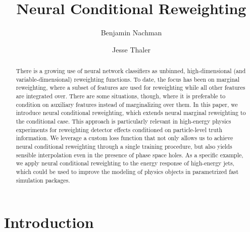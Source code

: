 \documentclass[aps,prx,reprint,preprintnumbers,superscriptaddress,nofootinbib,longbibliography,floatfix]{revtex4-2}
\begin{document}

\title{Neural Conditional Reweighting}

\author{Benjamin Nachman}

\author{Jesse Thaler}

\begin{abstract}
%
There is a growing use of neural network classifiers as unbinned, high-dimensional (and variable-dimensional) reweighting functions.
%
To date, the focus has been on marginal reweighting, where a subset of features are used for reweighting while all other features are integrated over.
%
There are some situations, though, where it is preferable to condition on auxiliary features instead of marginalizing over them.
%
In this paper, we introduce neural conditional reweighting, which extends neural marginal reweighting to the conditional case.
%
This approach is particularly relevant in high-energy physics experiments for reweighting detector effects conditioned on particle-level truth information.
%
We leverage a custom loss function that not only allows us to achieve neural conditional reweighting through a single training procedure, but also yields sensible interpolation even in the presence of phase space holes.
%
As a specific example, we apply neural conditional reweighting to the energy response of high-energy jets, which could be used to improve the modeling of physics objects in parametrized fast simulation packages.
%
\end{abstract}

\maketitle


{\small
\tableofcontents
}

\section{Introduction}
\end{document}
